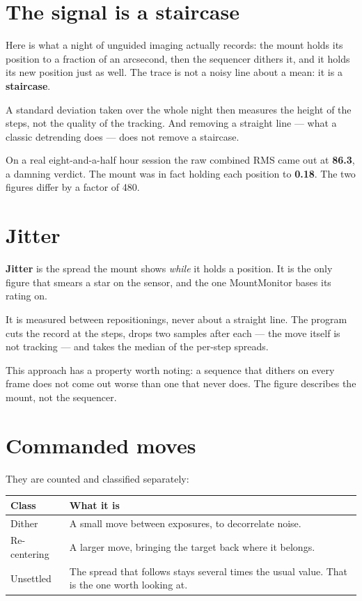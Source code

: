 \section{The signal is a staircase}

Here is what a night of unguided imaging actually records: the mount holds its
position to a fraction of an arcsecond, then the sequencer dithers it, and it
holds its new position just as well. The trace is not a noisy line about a
mean: it is a \textbf{staircase}.

A standard deviation taken over the whole night then measures the height of the
steps, not the quality of the tracking. And removing a straight line --- what a
classic detrending does --- does not remove a staircase.

\begin{info}
On a real eight-and-a-half hour session the raw combined RMS came out at
\textbf{86.3\arcsec}, a damning verdict. The mount was in fact holding each
position to \textbf{0.18\arcsec}. The two figures differ by a factor of 480.
\end{info}

\section{Jitter}

\textbf{Jitter} is the spread the mount shows \emph{while} it holds a position.
It is the only figure that smears a star on the sensor, and the one
MountMonitor bases its rating on.

It is measured between repositionings, never about a straight line. The program
cuts the record at the steps, drops two samples after each --- the move itself
is not tracking --- and takes the median of the per-step spreads.

\begin{tip}
This approach has a property worth noting: a sequence that dithers on every
frame does not come out worse than one that never does. The figure describes
the mount, not the sequencer.
\end{tip}

\section{Commanded moves}

They are counted and classified separately:

\begin{center}
\begin{tabularx}{\textwidth}{lX}
\toprule
\textbf{Class} & \textbf{What it is} \\
\midrule
Dither & A small move between exposures, to decorrelate noise. \\
Re-centering & A larger move, bringing the target back where it belongs. \\
Unsettled & The spread that follows stays several times the usual value. That
is the one worth looking at. \\
\bottomrule
\end{tabularx}
\end{center}

